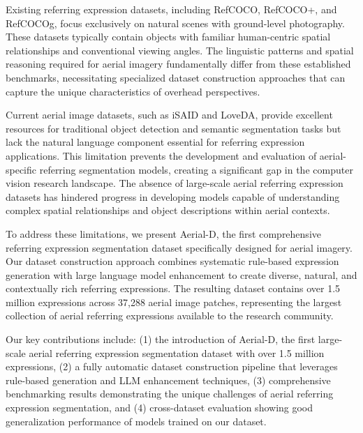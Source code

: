 Existing referring expression datasets, including RefCOCO, RefCOCO+, and RefCOCOg, focus exclusively on natural scenes with ground-level photography. These datasets typically contain objects with familiar human-centric spatial relationships and conventional viewing angles. The linguistic patterns and spatial reasoning required for aerial imagery fundamentally differ from these established benchmarks, necessitating specialized dataset construction approaches that can capture the unique characteristics of overhead perspectives.

Current aerial image datasets, such as iSAID and LoveDA, provide excellent resources for traditional object detection and semantic segmentation tasks but lack the natural language component essential for referring expression applications. This limitation prevents the development and evaluation of aerial-specific referring segmentation models, creating a significant gap in the computer vision research landscape. The absence of large-scale aerial referring expression datasets has hindered progress in developing models capable of understanding complex spatial relationships and object descriptions within aerial contexts.

To address these limitations, we present Aerial-D, the first comprehensive referring expression segmentation dataset specifically designed for aerial imagery. Our dataset construction approach combines systematic rule-based expression generation with large language model enhancement to create diverse, natural, and contextually rich referring expressions. The resulting dataset contains over 1.5 million expressions across 37,288 aerial image patches, representing the largest collection of aerial referring expressions available to the research community.

Our key contributions include: (1) the introduction of Aerial-D, the first large-scale aerial referring expression segmentation dataset with over 1.5 million expressions, (2) a fully automatic dataset construction pipeline that leverages rule-based generation and LLM enhancement techniques, (3) comprehensive benchmarking results demonstrating the unique challenges of aerial referring expression segmentation, and (4) cross-dataset evaluation showing good generalization performance of models trained on our dataset.


